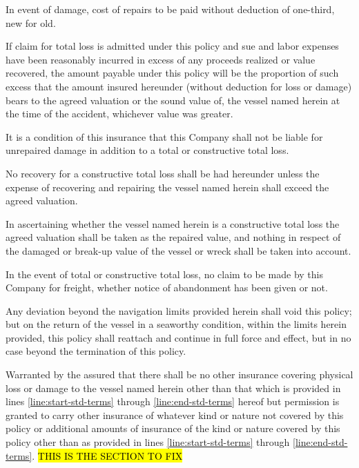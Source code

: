 \documentclass[10pt]{article}
\begin{document}
\begin{linenumbers}
In event of damage, cost of repairs to be paid without deduction of one-third, new for old. 

If claim  for total loss is admitted under this policy and sue and labor expenses have been reasonably incurred in excess  of  any  proceeds  realized  or  value  recovered,  the  amount  payable  under  this  policy  will  be  the  proportion  of such  excess  that  the  amount  insured  hereunder (without  deduction  for  loss  or  damage)  bears  to  the  agreed  valuation or the sound value of, the vessel named herein at the time of the accident, whichever value was greater.  

It  is  a  condition  of  this  insurance  that  this  Company  shall  not  be  liable  for  unrepaired  damage  in  addition to a total or constructive total loss. 

No recovery for a constructive total loss shall be had hereunder unless the expense of recovering and repairing the vessel named herein shall exceed the agreed valuation. 

In  ascertaining  whether  the  vessel  named  herein  is  a  constructive  total  loss  the  agreed  valuation  shall  be taken  as  the  repaired  value,  and  nothing  in  respect  of  the  damaged  or  break-up  value  of  the  vessel  or  wreck  shall be taken into account.

In  the  event  of  total  or  constructive  total  loss,  no  claim  to  be  made  by  this  Company  for  freight,  whether notice of abandonment has been given or not. 

Any  deviation  beyond  the  navigation  limits  provided  herein  shall  void  this  policy;  but  on  the  return  of  the vessel  in  a  seaworthy  condition,  within  the  limits  herein  provided,  this  policy  shall  reattach  and  continue  in  full force and effect, but in no case beyond the termination of this policy.

Warranted by the assured that there shall   be   no   other   insurance   covering   physical   loss   or   damage   to   the vessel  named  herein  other  than  that  which  is  provided  in  lines \ref{line:start-std-terms} through \ref{line:end-std-terms} hereof  but  permission  is granted to  carry  other  insurance  of  whatever  kind  or  nature  not  covered  by  this  policy  or  additional  amounts  of  insurance of the kind or nature covered by this policy other than as provided in lines \ref{line:start-std-terms} through \ref{line:end-std-terms}. \hl{THIS IS THE SECTION TO FIX}


\end{linenumbers}
\end{document}
